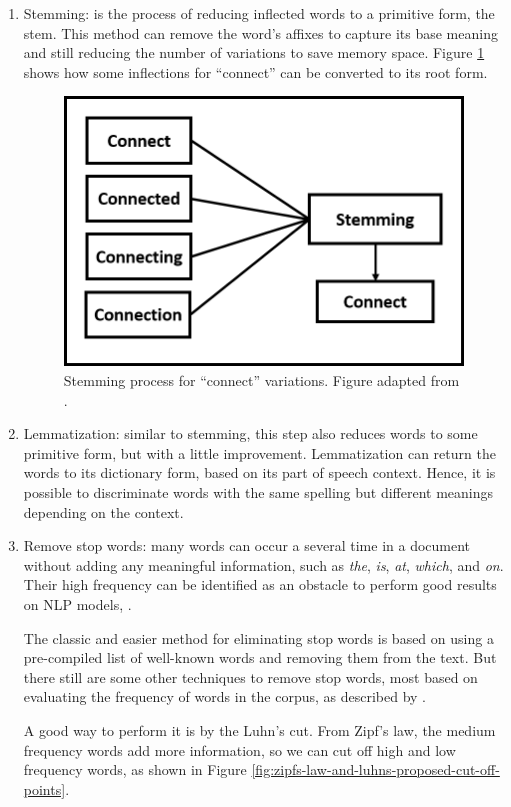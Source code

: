 	\begin{enumerate}
		\item Stemming: is the process of reducing inflected words to a primitive form, the stem. This method can remove the word's affixes to capture its base meaning and still reducing the number of variations to save memory space. Figure \ref{fig:stemming} shows how some inflections for ``connect'' can be converted to its root form.

		\begin{figure}[h!]
			\centering
			\includegraphics[width=0.45\linewidth]{01.Chapters/02.Background/stemming}
			\caption{Stemming process for ``connect'' variations. Figure adapted from .}
			\label{fig:stemming}
		\end{figure}


		\item Lemmatization: similar to stemming, this step also reduces words to some primitive form, but with a little improvement. Lemmatization can return the words to its dictionary form, based on its part of speech context. Hence, it is possible to discriminate words with the same spelling but different meanings depending on the context.

		\item Remove stop words:
		many words can occur a several time in a document without adding any meaningful information, such as \textit{the}, \textit{is}, \textit{at}, \textit{which}, and \textit{on}. Their high frequency can be identified as an obstacle to perform good results on NLP models, \cite{kannan2014preprocessing}.

		The classic and easier method for eliminating stop words is based on using a pre-compiled list of well-known words and removing them from the text.
		But there still are some other techniques to remove stop words, most based on evaluating the frequency of words in the corpus, as described by \cite{vijayarani2015preprocessing}.

		A good way to perform it is by the Luhn's cut. From Zipf's law, the medium frequency words add more information, so we can cut off high and low frequency words, as shown in Figure \ref{fig:zipfs-law-and-luhns-proposed-cut-off-points}.


\end{enumerate}

